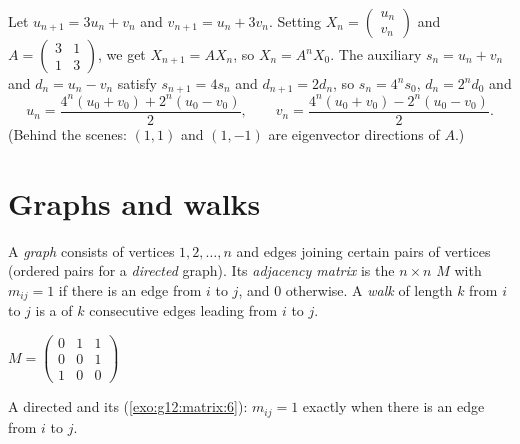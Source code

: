 \begin{example}\label{ex:g12:matrix:coupled}
Let $u_{n+1} = 3u_n + v_n$ and $v_{n+1} = u_n + 3v_n$. Setting
$X_n = \begin{pmatrix} u_n\\ v_n \end{pmatrix}$ and
$A = \begin{pmatrix} 3 & 1\\ 1 & 3\end{pmatrix}$, we get
$X_{n+1} = AX_n$, so $X_n = A^n X_0$. The auxiliary 
$s_n = u_n + v_n$ and $d_n = u_n - v_n$ satisfy $s_{n+1} = 4s_n$ and
$d_{n+1} = 2d_n$, so $s_n = 4^n s_0$, $d_n = 2^n d_0$ and
\[
u_n = \frac{4^n(u_0+v_0) + 2^n(u_0-v_0)}{2}, \qquad
v_n = \frac{4^n(u_0+v_0) - 2^n(u_0-v_0)}{2}.
\]
(Behind the scenes: $(1,1)$ and $(1,-1)$ are eigenvector directions of $A$.)
\end{example}

\section{Graphs and walks}

\begin{definition}\label{def:g12:matrix:graph}
A \emph{graph} consists of vertices $1, 2, \dots, n$ and edges
joining certain pairs of vertices (ordered pairs for a \emph{directed}
graph). Its \emph{adjacency matrix} is the
$n \times n$  $M$ with $m_{ij} = 1$ if there is an edge from $i$ to
$j$, and $0$ otherwise. A \emph{walk} of length $k$ from $i$ to $j$ is a
 of $k$ consecutive edges leading from $i$ to $j$.
\end{definition}

\begin{omfigure}
\qquad\qquad
$M = \begin{pmatrix} 0 & 1 & 1\\ 0 & 0 & 1\\ 1 & 0 & 0 \end{pmatrix}$

{\small A directed  and its 
(\cref{exo:g12:matrix:6}): $m_{ij} = 1$ exactly when there is an edge
from $i$ to $j$.}
\end{omfigure}

